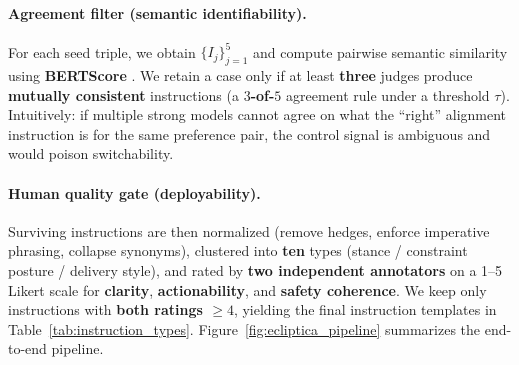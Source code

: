 \paragraph{Agreement filter (semantic identifiability).}
For each seed triple, we obtain $\{I_j\}_{j=1}^{5}$ and compute pairwise semantic similarity using
\textbf{BERTScore} \cite{zhang2019bertscore}.
We retain a case only if at least \textbf{three} judges produce \textbf{mutually consistent} instructions (a \textbf{$3$-of-$5$} agreement rule under a threshold $\tau$).
Intuitively: if multiple strong models cannot agree on what the “right” alignment instruction is for the same preference pair,
the control signal is ambiguous and would poison switchability.











\vspace{-0.5em}
\paragraph{Human quality gate (deployability).}
Surviving instructions are then normalized (remove hedges, enforce imperative phrasing, collapse synonyms),
clustered into \textbf{ten} types (stance / constraint posture / delivery style),
and rated by \textbf{two independent annotators} on a 1--5 Likert scale
for \textbf{clarity}, \textbf{actionability}, and \textbf{safety coherence}.
We keep only instructions with \textbf{both ratings $\ge 4$},
yielding the final instruction templates in Table~\ref{tab:instruction_types}.
Figure~\ref{fig:ecliptica_pipeline} summarizes the end-to-end pipeline.

